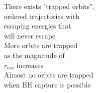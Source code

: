 \documentclass[preview]{standalone}
\begin{document}
There exists "trapped orbits",\\ordered trajectories with\\escaping energies that\\will never escape\\More orbits are trapped\\as the magnitude of\\$r_{esc}$ increases\\Almost no orbits are trapped\\ when BH capture is possible\\
\end{document}
